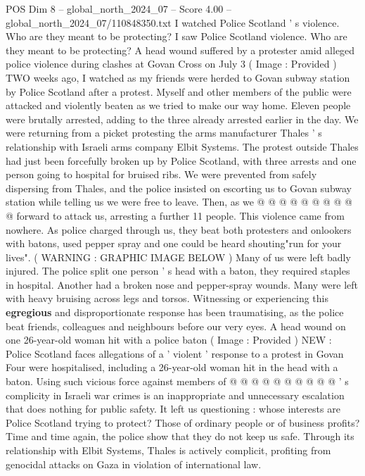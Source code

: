 \begin{textsample}{POS Dim 8 – global\_north\_2024\_07 – Score 4.00 – global\_north\_2024\_07/110848350.txt}  \label{ex:f8_pos_268}
I watched Police Scotland ' s violence.
Who are they meant to be protecting?
I saw Police Scotland violence.
Who are they meant to be protecting?
A head wound suffered by a protester amid alleged police violence during clashes at Govan Cross on July 3 ( Image : Provided ) TWO weeks ago, I watched as my friends were herded to Govan subway station by Police Scotland after a protest.
Myself and other members of the public were attacked and violently beaten as we tried to make our way home.
Eleven people were brutally arrested, adding to the three already arrested earlier in the day.
We were returning from a picket protesting the arms manufacturer Thales ' s relationship with Israeli arms company Elbit Systems.
The protest outside Thales had just been forcefully broken up by Police Scotland, with three arrests and one person going to hospital for bruised ribs.
We were prevented from safely dispersing from Thales, and the police insisted on escorting us to Govan subway station while telling us we were free to leave.
Then, as we @ @ @ @ @ @ @ @ @ @ forward to attack us, arresting a further 11 people.
This violence came from nowhere.
As police charged through us, they beat both protesters and onlookers with batons, used pepper spray and one could be heard shouting"run for your lives". ( WARNING : GRAPHIC IMAGE BELOW ) Many of us were left badly injured.
The police split one person ' s head with a baton, they required staples in hospital.
Another had a broken nose and pepper-spray wounds.
Many were left with heavy bruising across legs and torsos.
Witnessing or experiencing this \textbf{egregious} and disproportionate response has been traumatising, as the police beat friends, colleagues and neighbours before our very eyes.
A head wound on one 26-year-old woman hit with a police baton ( Image : Provided ) NEW : Police Scotland faces allegations of a ' violent ' response to a protest in Govan Four were hospitalised, including a 26-year-old woman hit in the head with a baton.
Using such vicious force against members of @ @ @ @ @ @ @ @ @ @ ' s complicity in Israeli war crimes is an inappropriate and unnecessary escalation that does nothing for public safety.
It left us questioning : whose interests are Police Scotland trying to protect?
Those of ordinary people or of business profits?
Time and time again, the police show that they do not keep us safe.
Through its relationship with Elbit Systems, Thales is actively complicit, profiting from genocidal attacks on Gaza in violation of international law.

\end{textsample}
